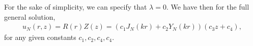 For the sake of simplicity, we can specify that $\lambda=0$.
We have then for the full general solution,
\begin{align}
	u_N(r,z) = R(r)Z(z) = \left( c_1 J_N \left( k r \right) + c_2 Y_N \left( k r \right) \right) \left( c_3 z + c_4 \right),
\end{align}
for any given constants $c_1,c_2,c_4,c_4$.

